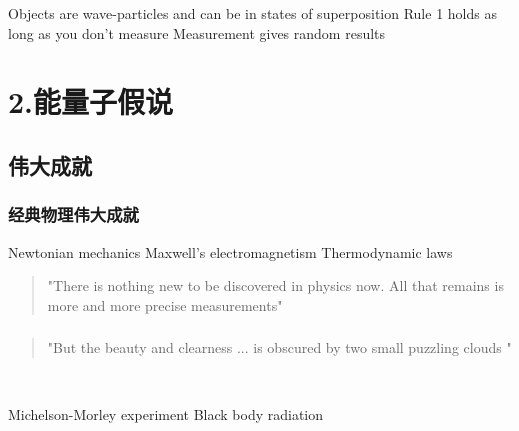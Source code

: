 \begin{frame}
    \begin{tcolorbox4}[三条军规]    
        \begin{enumerate}
            \Item Objects are wave-particles and can be in states of superposition
            \Item Rule 1 holds as long as you don't measure
            \Item Measurement gives random results
        \end{enumerate}
    \end{tcolorbox4} 
\end{frame}

\section{2.能量子假说}

\subsection{伟大成就}

\begin{frame}[t]
    \frametitle{经典物理伟大成就}
    \begin{tcolorbox3}
        \begin{enumerate}
            \Item Newtonian mechanics
            \Item Maxwell's electromagnetism
            \Item Thermodynamic laws
        \end{enumerate}
    \end{tcolorbox3}  
    \begin{quotation}
        "There is nothing new to be discovered in physics now. All that remains is 
        more and more precise measurements"   \\
    \end{quotation}
\end{frame}

\begin{frame}
    \frametitle{}
    \begin{quotation}
        "But the beauty and clearness ... is obscured by two small puzzling clouds \faCloud "  \\
    \end{quotation}
    ~~ \vspace{0.3em}
    \begin{tcolorbox4}[两朵乌云]    
        \begin{enumerate}
        \Item Michelson-Morley experiment
        \Item Black body radiation
        \end{enumerate}
    \end{tcolorbox4} 
\end{frame}

